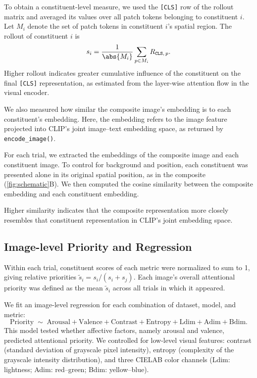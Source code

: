 \documentclass{article}
\begin{document}
To obtain a constituent-level measure, we used the \texttt{[CLS]} row of the rollout matrix and averaged its values over all patch tokens belonging to constituent $i$. 
Let $M_i$ denote the set of patch tokens in constituent
$i$'s spatial region. The rollout of constituent $i$ is
\begin{equation}
  s_i = \frac{1}{\abs{M_i}} \sum_{p \in M_i} R_{\texttt{CLS},\, p}.
\end{equation}
Higher rollout indicates greater cumulative influence of the constituent on the final \texttt{[CLS]} representation, as estimated from the layer-wise attention flow in the visual encoder.

We also measured how similar the composite image's embedding is to each
constituent's embedding. Here, the embedding refers to the image feature
projected into CLIP's joint image--text embedding space, as returned by
\texttt{encode\_image()}.

For each trial, we extracted the embeddings of the composite image and each constituent image. 
To control for background and position, each constituent was presented alone in its original spatial position, as in the composite (\cref{fig:schematic}B). 
We then computed the cosine similarity between the composite embedding and each constituent embedding.

Higher similarity indicates that the composite representation more closely
resembles that constituent representation in CLIP's joint embedding space.

\subsection{Image-level Priority and Regression}

Within each trial, constituent scores of each metric were normalized to sum to 1, giving
relative priorities $\tilde{s}_i = s_i / (s_i + s_j)$. Each image's overall
attentional priority was defined as the mean $\tilde{s}_i$ across all trials in which it appeared.

We fit an image-level regression for each combination of dataset, model, and metric:
\begin{equation}
\label{eq:regression}
  \mathrm{Priority} \;\sim\;
  \mathrm{Arousal} + \mathrm{Valence} +
  \mathrm{Contrast} + \mathrm{Entropy} +
  \mathrm{Ldim} + \mathrm{Adim} + \mathrm{Bdim}.
\end{equation}
This model tested whether affective factors, namely arousal and valence,
predicted attentional priority. We controlled for low-level visual features:
contrast (standard deviation of grayscale pixel intensity), entropy
(complexity of the grayscale intensity distribution), and three CIELAB color
channels (Ldim: lightness; Adim: red--green; Bdim: yellow--blue).
\end{document}
